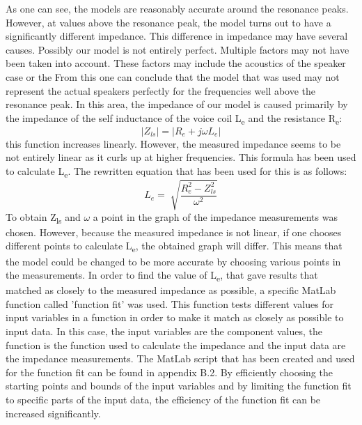 \documentclass{article}
\newcommand\abs[1]{\left|#1\right|}
\begin{document}
As one can see, the models are reasonably accurate around the resonance peaks. However, at values above the resonance peak, the model turns out to have a significantly different impedance. This difference in impedance may have several causes. Possibly our model is not entirely perfect. Multiple factors may not have been taken into account. These factors may include the acoustics of the speaker case or the 
\newline 
\newline 
From this one can conclude that the model that was used may not represent the actual speakers perfectly for the frequencies well above the resonance peak. In this area, the impedance of our model is caused primarily by the impedance of the self inductance of the voice coil L\textsubscript{e} and the resistance R\textsubscript{e}: 
$$\abs{Z_{ls}} = \abs{R_e + j \omega L_e}$$
\newline
this function increases linearly. However, the measured impedance seems to be not entirely linear as it curls up at higher frequencies. This formula has been used to calculate L\textsubscript{e}. The rewritten equation that has been used for this is as follows:
\newline
$$L_e =\sqrt[]{\frac{R_e^2 - Z_{ls} ^2}{\omega^2}}$$
\newline
To obtain Z\textsubscript{ls} and $\omega$ a point in the graph of the impedance measurements was chosen. However, because the measured impedance is not linear, if one chooses different points to calculate L\textsubscript{e}, the obtained graph will differ. This means that the model could be changed to be more accurate by choosing various points in the measurements.
\newline
\newline
In order to find the value of L\textsubscript{e}, that gave results that matched as closely to the measured impedance as possible, a specific MatLab function called 'function fit' was used. This function tests different values for input variables in a function in order to make it match as closely as possible to input data. In this case, the input variables are the component values, the function is the function used to calculate the impedance and the input data are the impedance measurements.
\newline
\newline
The MatLab script that has been created and used for the function fit can be found in appendix B.2.
\newline
\newline
By efficiently choosing the starting points and bounds of the input variables and by limiting the function fit to specific parts of the input data,
the efficiency of the function fit can be increased significantly.
\newline
\newline
\end{document}
